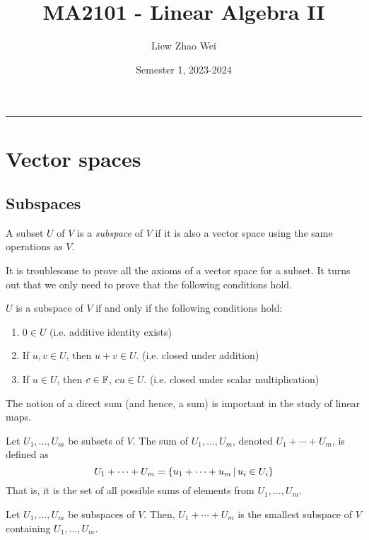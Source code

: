 \documentclass{article}
\title{MA2101 - Linear Algebra II}
\author{Liew Zhao Wei}
\date{Semester 1, 2023-2024}
\begin{document}
\maketitle
\hrule

\section{Vector spaces}

\subsection{Subspaces}

\begin{definition}[Subspace]
  A subset $U$ of $V$ is a \emph{subspace} of $V$ if it is also a vector space using the same operations as $V$.
\end{definition}
It is troublesome to prove all the axioms of a vector space for a subset.
It turns out that we only need to prove that the following conditions hold.

\begin{theorem}
  $U$ is a subspace of $V$ if and only if the following conditions hold:
  \begin{enumerate}
    \item $0 \in U$ (i.e. additive identity exists)
    \item If $u, v \in U$, then $u + v \in U$. (i.e. closed under addition)
    \item If $u \in U$, then $c \in \mathbb{F}$, $cu \in U$. (i.e. closed under scalar multiplication)
  \end{enumerate}
\end{theorem}

The notion of a direct sum (and hence, a sum) is important in the study of linear maps.

\begin{definition}
  Let $U_1, \ldots, U_m$ be subsets of $V$.
  The sum of $U_1, \ldots, U_m$, denoted $U_1 + \cdots + U_m$, is defined as
  \[
    U_1 + \cdots + U_m = \{u_1 + \cdots + u_m \,|\, u_i \in U_i\}
  \]
  That is, it is the set of all possible sums of elements from $U_1, \ldots, U_m$.
\end{definition}

\begin{theorem}
  Let $U_1, \ldots, U_m$ be subspaces of $V$.
  Then, $U_1 + \cdots + U_m$ is the smallest subspace of $V$ containing $U_1, \ldots, U_m$.
\end{theorem}
\end{document}
